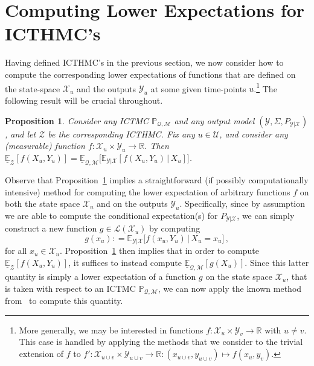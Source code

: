 \documentclass[3p]{elsarticle}
\newtheorem{proposition}[theorem]{Proposition}
\newcommand{\reals}{\mathbb{R}}
\newcommand{\states}{\mathcal{X}}
\newcommand{\observs}{\mathcal{Y}}
\newcommand{\gambles}{\mathcal{L}}
\newcommand{\rateset}{\mathcal{Q}}
\newcommand{\coloneqq}{:\!=}
\begin{document}
\section{Computing Lower Expectations for ICTHMC's}\label{sec:computing_icthmc}

Having defined ICTHMC's in the previous section, we now consider how to compute the corresponding lower expectations of functions that are defined on the state-space $\states_u$ and the outputs $\observs_u$ at some given time-points $u$.\footnote{More generally, we may be interested in functions $f:\states_u\times\observs_v\to\reals$ with $u\neq v$. This case is handled by applying the methods that we consider to the trivial extension of $f$ to $f':\states_{u\cup v}\times\observs_{u\cup v}\to\reals:(x_{u\cup v},y_{u\cup v})\mapsto f(x_u,y_v)$.} The following result will be crucial throughout.

\begin{proposition}\label{prop:marg_observs}
Consider any ICTMC $\mathbb{P}_{\rateset,\mathcal{M}}$ and any output model $(\observs,\Sigma,P_{\observs\vert\states})$, and let $\mathcal{Z}$ be the corresponding ICTHMC. Fix any $u\in\mathcal{U}$, and consider any (measurable) function $f:\states_u\times \observs_u\to\reals$. Then $\underline{\mathbb{E}}_\mathcal{Z}\left[f(X_u,Y_u)\right] = \underline{\mathbb{E}}_{\mathcal{Q},\mathcal{M}}\bigl[ \mathbb{E}_{\observs\vert\states}[f(X_u,Y_u)\,\vert\,X_u] \bigr]$.
\end{proposition}

Observe that Proposition~\ref{prop:marg_observs} implies a straightforward (if possibly computationally intensive) method for computing the lower expectation of arbitrary functions $f$ on both the state space $\states_u$ and on the outputs $\observs_u$. Specifically, since by assumption we are able to compute the conditional expectation(s) for $P_{\observs\vert\states}$, we can simply construct a new function $g\in\gambles(\states_u)$ by computing
\begin{equation*}
g(x_u) \coloneqq \mathbb{E}_{\observs\vert\states}\bigl[f(x_u,Y_u)\,\vert\,X_u=x_u\bigr]\,,
\end{equation*}
for all $x_u\in\states_u$. Proposition~\ref{prop:marg_observs} then implies that in order to compute $\underline{\mathbb{E}}_\mathcal{Z}[f(X_u,Y_u)]$, it suffices to instead compute $\underline{\mathbb{E}}_{\rateset,\mathcal{M}}[g(X_u)]$. Since this latter quantity is simply a lower expectation of a function $g$ on the state space $\states_u$, that is taken with respect to an ICTMC $\mathbb{P}_{\rateset,\mathcal{M}}$, we can now apply the known method from~\cite{krak2016ictmc} to compute this quantity.
\end{document}
